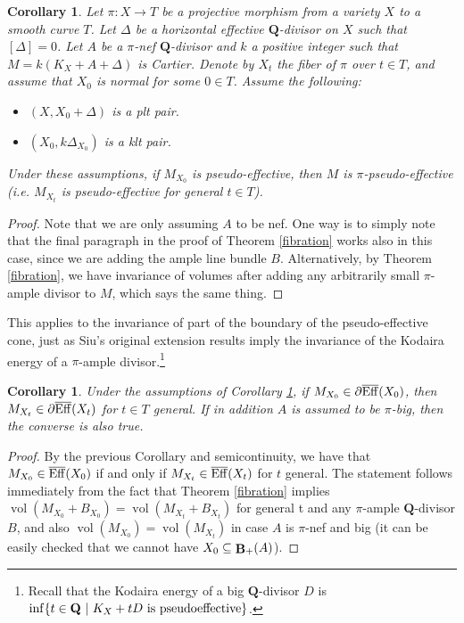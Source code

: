 \documentclass[11pt]{amsart}
\theoremstyle{plain}
\newtheorem{corollary}[theorem]{Corollary}
\theoremstyle{definition}
\newcommand{\QQ}{\mathbf{Q}}
\DeclareMathOperator{\vol}{vol}
\DeclareMathOperator{\BB}{{\bf B}}
\begin{document}
\begin{corollary}\label{pseudoeffective}
Let $\pi : X \rightarrow T$ be a projective morphism from a variety $X$ to a smooth curve $T$. Let $\Delta$ be a horizontal effective 
$\QQ$-divisor on $X$ such that $[\Delta] = 0$. Let $A$ be a $\pi$-nef $\QQ$-divisor and $k$ a positive integer such that $M = k(K_X + A + \Delta)$ is Cartier. Denote by $X_t$ the fiber of $\pi$ over $t\in T$, and assume that $X_0$ is normal for some $0 \in T$. Assume the following:
\begin{itemize}
\item $(X, X_0 + \Delta)$ is a plt pair. 
\item $(X_0, k\Delta_{X_0})$ is a klt pair. 
\end{itemize}
Under these assumptions, if $M_{X_0}$ is pseudo-effective, then $M$ is 
$\pi$-pseudo-effective (i.e. $M_{X_t}$ is pseudo-effective for general $t\in T$). 
\end{corollary}
\begin{proof}
Note that we are only  assuming $A$ to be nef. One way is to simply note that the final paragraph in the proof of Theorem 
\ref{fibration} works also in this case, since we are adding the ample line bundle $B$. Alternatively, by Theorem \ref{fibration}, 
we have invariance of volumes after adding any arbitrarily small $\pi$-ample divisor to $M$, which says the same thing. 
\end{proof}

This applies to the invariance of part of the boundary of the pseudo-effective cone, just as Siu's original extension results imply the invariance of the Kodaira energy of a $\pi$-ample divisor.\footnote{Recall that the Kodaira energy of a big $\QQ$-divisor $D$ is ${\rm inf} \{ t\in \QQ ~| ~K_X + t D {\rm~ is~ pseudoeffective}\}$.}

\begin{corollary}\label{boundary}
Under the assumptions of Corollary \ref{pseudoeffective}, if $M_{X_0} \in \partial \overline{{\rm Eff}} (X_0)$, then 
$M_{X_t} \in \partial \overline{{\rm Eff}} (X_t)$ for $t\in T$ general. If in addition $A$ is assumed to be $\pi$-big, then the 
converse is also true.
\end{corollary}
\begin{proof}
By the previous Corollary and semicontinuity, we have that $M_{X_0} \in  \overline{{\rm Eff}} (X_0)$ if and only if $M_{X_t} \in 
\overline{{\rm Eff}} (X_t)$ for $t$ general. The statement follows immediately from the fact that Theorem \ref{fibration} implies 
$\vol (M_{X_0}  + B_{X_0}) =  \vol (M_{X_t}  + B_{X_t})$ for general t and any $\pi$-ample $\QQ$-divisor $B$, and also 
$\vol (M_{X_0}) =  \vol (M_{X_t})$ in case $A$ is $\pi$-nef and big (it can be easily checked that 
we cannot have $X_0 \subseteq \BB_{+} (A)$).
\end{proof}
\end{document}
